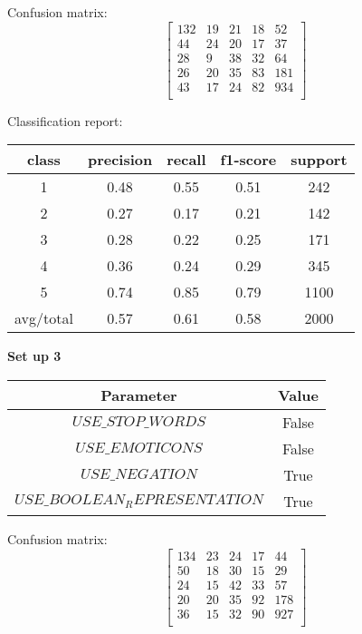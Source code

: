 \documentclass[12pt]{report}
\begin{document}
Confusion matrix:
\[
\begin{bmatrix}
132 & 19 & 21 & 18 & 52 \\
44 & 24 & 20 & 17 & 37 \\
28 &  9 & 38 & 32 & 64 \\
26 & 20 & 35 & 83 & 181 \\
43 & 17 & 24 & 82 & 934 \\
\end{bmatrix}
\]

Classification report:

\begin{center}
	\begin{tabular}{c | c | c | c | c }
		\hline
		class & precision & recall & f1-score & support \\ \hline
		1 & 0.48 & 0.55 & 0.51 & 242 \\ \hline
		2 & 0.27 & 0.17 & 0.21 & 142 \\ \hline
		3 & 0.28 & 0.22 & 0.25 & 171 \\ \hline
		4 & 0.36 & 0.24 & 0.29 & 345 \\ \hline
		5 & 0.74 & 0.85 & 0.79 & 1100 \\ \hline
		avg/total & 0.57 & 0.61 & 0.58 & 2000 \\ \hline
	\end{tabular}
\end{center}


\textbf{Set up 3}

\begin{center}
	\begin{tabular}{ c | c }
		\hline
		Parameter & Value \\ \hline
		$USE\_STOP\_WORDS$ & False \\ \hline
		$USE\_EMOTICONS$ & False \\ \hline
		$USE\_NEGATION$ & True \\ \hline
		$USE\_BOOLEAN_REPRESENTATION$ & True \\ \hline
	\end{tabular}
\end{center}

Confusion matrix:
\[
\begin{bmatrix}
134 & 23 & 24 & 17 & 44 \\
50 & 18 & 30 & 15 & 29 \\
24 & 15 & 42 & 33 & 57 \\
20 & 20 & 35 & 92 & 178 \\
36 & 15 & 32 & 90 & 927 \\
\end{bmatrix}
\]
\end{document}
